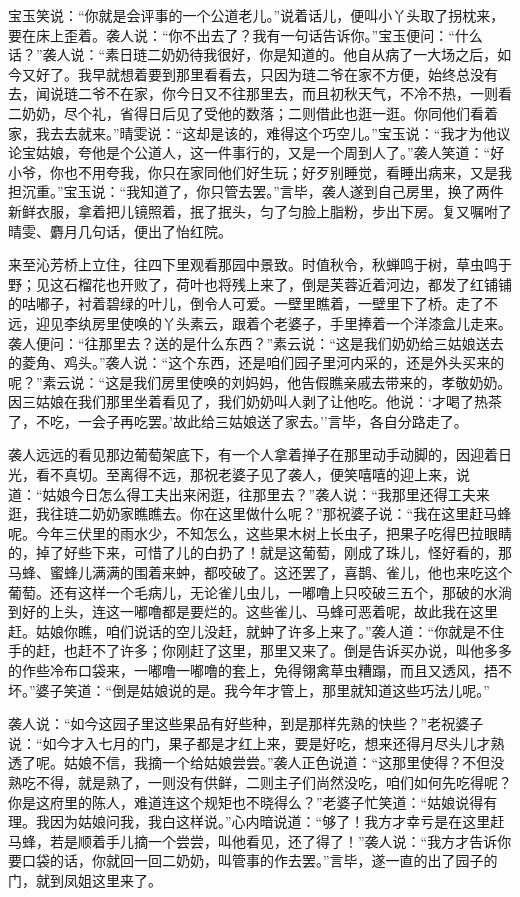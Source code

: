 宝玉笑说：``你就是会评事的一个公道老儿。''说着话儿，便叫小丫头取了拐枕来，要在床上歪着。袭人说：``你不出去了？我有一句话告诉你。''宝玉便问：``什么话？''袭人说：``素日琏二奶奶待我很好，你是知道的。他自从病了一大场之后，如今又好了。我早就想着要到那里看看去，只因为琏二爷在家不方便，始终总没有去，闻说琏二爷不在家，你今日又不往那里去，而且初秋天气，不冷不热，一则看二奶奶，尽个礼，省得日后见了受他的数落；二则借此也逛一逛。你同他们看着家，我去去就来。''晴雯说：``这却是该的，难得这个巧空儿。''宝玉说：``我才为他议论宝姑娘，夸他是个公道人，这一件事行的，又是一个周到人了。''袭人笑道：``好小爷，你也不用夸我，你只在家同他们好生玩；好歹别睡觉，看睡出病来，又是我担沉重。''宝玉说：``我知道了，你只管去罢。''言毕，袭人遂到自己房里，换了两件新鲜衣服，拿着把儿镜照着，抿了抿头，匀了匀脸上脂粉，步出下房。复又嘱咐了晴雯、麝月几句话，便出了怡红院。

来至沁芳桥上立住，往四下里观看那园中景致。时值秋令，秋蝉鸣于树，草虫鸣于野；见这石榴花也开败了，荷叶也将残上来了，倒是芙蓉近着河边，都发了红铺铺的咕嘟子，衬着碧绿的叶儿，倒令人可爱。一壁里瞧着，一壁里下了桥。走了不远，迎见李纨房里使唤的丫头素云，跟着个老婆子，手里捧着一个洋漆盒儿走来。袭人便问：``往那里去？送的是什么东西？''素云说：``这是我们奶奶给三姑娘送去的菱角、鸡头。''袭人说：``这个东西，还是咱们园子里河内采的，还是外头买来的呢？''素云说：``这是我们房里使唤的刘妈妈，他告假瞧亲戚去带来的，孝敬奶奶。因三姑娘在我们那里坐着看见了，我们奶奶叫人剥了让他吃。他说：`才喝了热茶了，不吃，一会子再吃罢。'故此给三姑娘送了家去。''言毕，各自分路走了。

袭人远远的看见那边葡萄架底下，有一个人拿着掸子在那里动手动脚的，因迎着日光，看不真切。至离得不远，那祝老婆子见了袭人，便笑嘻嘻的迎上来，说道：``姑娘今日怎么得工夫出来闲逛，往那里去？''袭人说：``我那里还得工夫来逛，我往琏二奶奶家瞧瞧去。你在这里做什么呢？''那祝婆子说：``我在这里赶马蜂呢。今年三伏里的雨水少，不知怎么，这些果木树上长虫子，把果子吃得巴拉眼睛的，掉了好些下来，可惜了儿的白扔了！就是这葡萄，刚成了珠儿，怪好看的，那马蜂、蜜蜂儿满满的围着来蚛，都咬破了。这还罢了，喜鹊、雀儿，他也来吃这个葡萄。还有这样一个毛病儿，无论雀儿虫儿，一嘟噜上只咬破三五个，那破的水淌到好的上头，连这一嘟噜都是要烂的。这些雀儿、马蜂可恶着呢，故此我在这里赶。姑娘你瞧，咱们说话的空儿没赶，就蚛了许多上来了。''袭人道：``你就是不住手的赶，也赶不了许多；你刚赶了这里，那里又来了。倒是告诉买办说，叫他多多的作些冷布口袋来，一嘟噜一嘟噜的套上，免得翎禽草虫糟蹋，而且又透风，捂不坏。''婆子笑道：``倒是姑娘说的是。我今年才管上，那里就知道这些巧法儿呢。''

袭人说：``如今这园子里这些果品有好些种，到是那样先熟的快些？''老祝婆子说：``如今才入七月的门，果子都是才红上来，要是好吃，想来还得月尽头儿才熟透了呢。姑娘不信，我摘一个给姑娘尝尝。''袭人正色说道：``这那里使得？不但没熟吃不得，就是熟了，一则没有供鲜，二则主子们尚然没吃，咱们如何先吃得呢？你是这府里的陈人，难道连这个规矩也不晓得么？''老婆子忙笑道：``姑娘说得有理。我因为姑娘问我，我白这样说。''心内暗说道：``够了！我方才幸亏是在这里赶马蜂，若是顺着手儿摘一个尝尝，叫他看见，还了得了！''袭人说：``我方才告诉你要口袋的话，你就回一回二奶奶，叫管事的作去罢。''言毕，遂一直的出了园子的门，就到凤姐这里来了。

